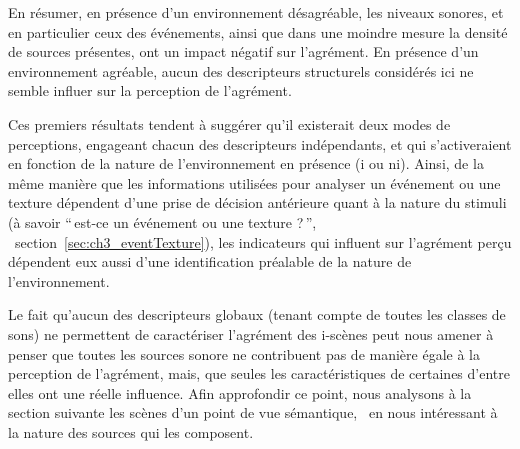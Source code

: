 En résumer, en présence d'un environnement désagréable, les niveaux sonores, et en particulier ceux des événements, ainsi que dans une moindre mesure la densité de sources présentes, ont un impact négatif sur l'agrément. En présence d'un environnement agréable, aucun des descripteurs structurels considérés ici ne semble influer sur la perception de l'agrément. 

Ces premiers résultats tendent à suggérer qu'il existerait deux modes de perceptions, engageant chacun des descripteurs indépendants, et qui s'activeraient en fonction de la nature de l'environnement en présence (i ou ni). Ainsi, de la même manière que les informations utilisées pour analyser un événement ou une texture dépendent d'une prise de décision antérieure quant à la nature du stimuli (à savoir ``\,est-ce un événement ou une texture ?\,'', \cf~section~\ref{sec:ch3_eventTexture}), les indicateurs qui influent sur l'agrément perçu dépendent eux aussi d'une identification préalable de la nature de l'environnement. 

Le fait qu'aucun des descripteurs globaux (tenant compte de toutes les classes de sons) ne permettent de caractériser l'agrément des i-scènes peut nous amener à penser que toutes les sources sonore ne contribuent pas de manière égale à la perception de l'agrément, mais, que seules les caractéristiques de certaines d'entre elles ont une réelle influence. Afin approfondir ce point, nous analysons à la section suivante les scènes d'un point de vue sémantique, \ie~en nous intéressant à la nature des sources qui les composent. \\


